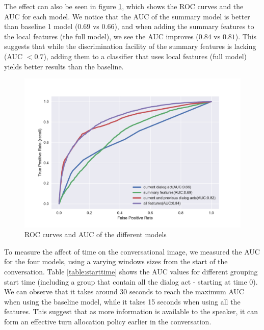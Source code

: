 The effect can also be seen in figure \ref{auc}, which shows the ROC curves and the AUC for each
model. We notice that the AUC of the summary model is better than baseline 1 model ($0.69$ vs $0.66$), and when adding the summary features to the local features (the full model), we see the AUC improves ($0.84$ vs $0.81$). This suggests that while the discrimination facility of the summary features is lacking (AUC $<0.7$), adding them to a classifier that uses local features (full model) yields better results than the baseline.
%
 \begin{figure}[ht!]
 \centering
 \includegraphics[width=\textwidth]{../scikitlearn/figures/roc.pdf}\vspace{-1.5em}
 \caption{ROC curves and AUC of the different models \label{overflow}}
\label{auc}
 \end{figure}


To measure the affect of time on the conversational image,
we measured the AUC for the four models, using a varying windows sizes from the start of
the conversation. Table \ref{table:starttime} shows the AUC values for different
grouping start time (including a group that contain all the dialog act - starting at time 0).
We can observe that it takes around 30 seconds to reach the maximum AUC when using the baseline model,
while it takes 15 seconds when using all the features. This suggest that as more information
is available to the speaker, it can form an effective turn allocation policy earlier in the conversation.

